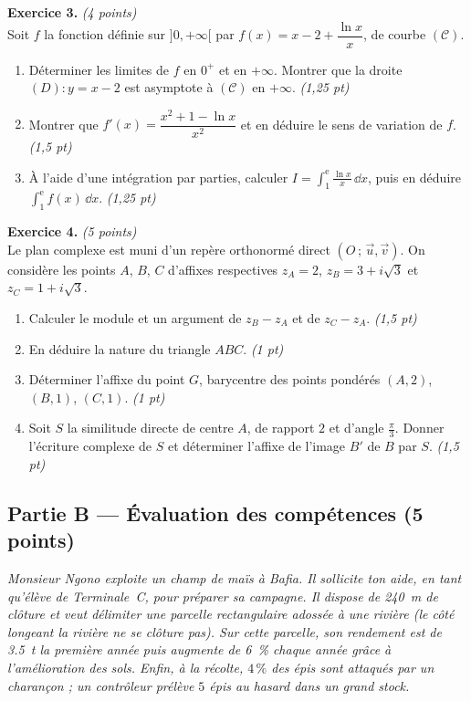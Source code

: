 \smallskip
\noindent\textbf{Exercice 3.} \hfill\textit{(4 points)}\\
Soit $f$ la fonction définie sur $]0,+\infty[$ par $f(x)=x-2+\dfrac{\ln x}{x}$, de courbe $(\mathcal{C})$.
\begin{enumerate}[label=\arabic*)]
\item Déterminer les limites de $f$ en $0^+$ et en $+\infty$. Montrer que la droite
$(D):y=x-2$ est asymptote à $(\mathcal{C})$ en $+\infty$. \hfill\textit{(1,25 pt)}
\item Montrer que $f'(x)=\dfrac{x^2+1-\ln x}{x^2}$ et en déduire le sens de variation de $f$. \hfill\textit{(1,5 pt)}
\item À l'aide d'une intégration par parties, calculer $\displaystyle I=\int_1^{\mathrm{e}}\frac{\ln x}{x}\,\dd x$,
puis en déduire $\displaystyle\int_1^{\mathrm{e}}f(x)\,\dd x$. \hfill\textit{(1,25 pt)}
\end{enumerate}

\smallskip
\noindent\textbf{Exercice 4.} \hfill\textit{(5 points)}\\
Le plan complexe est muni d'un repère orthonormé direct $(O\,;\,\vec u,\vec v)$.
On considère les points $A$, $B$, $C$ d'affixes respectives
$z_A=2$, $z_B=3+i\sqrt3$ et $z_C=1+i\sqrt3$.
\begin{enumerate}[label=\arabic*)]
\item Calculer le module et un argument de $z_B-z_A$ et de $z_C-z_A$. \hfill\textit{(1,5 pt)}
\item En déduire la nature du triangle $ABC$. \hfill\textit{(1 pt)}
\item Déterminer l'affixe du point $G$, barycentre des points pondérés
$(A,2)$, $(B,1)$, $(C,1)$. \hfill\textit{(1 pt)}
\item Soit $S$ la similitude directe de centre $A$, de rapport $2$ et d'angle $\frac\pi3$.
Donner l'écriture complexe de $S$ et déterminer l'affixe de l'image $B'$ de $B$ par $S$. \hfill\textit{(1,5 pt)}
\end{enumerate}

\subsection*{Partie B — Évaluation des compétences \hfill (5 points)}

\noindent\textit{Monsieur Ngono exploite un champ de maïs à Bafia. Il sollicite ton aide, en
tant qu'élève de Terminale~C, pour préparer sa campagne. Il dispose de \SI{240}{\metre} de
clôture et veut délimiter une parcelle rectangulaire \emph{adossée à une rivière} (le côté
longeant la rivière ne se clôture pas). Sur cette parcelle, son rendement est de
\SI{3,5}{\tonne} la première année puis augmente de \SI{6}{\percent} chaque année grâce à
l'amélioration des sols. Enfin, à la récolte, $4\,\%$ des épis sont attaqués par un
charançon ; un contrôleur prélève $5$ épis au hasard dans un grand stock.}

